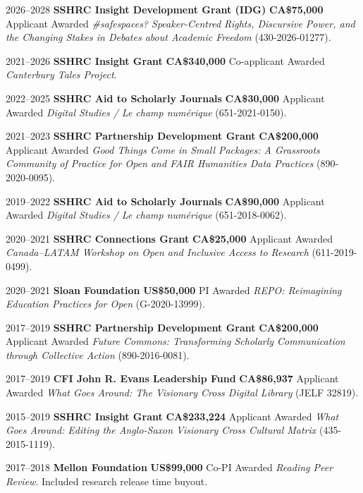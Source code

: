\documentclass[11pt,letterpaper,sans]{moderncv}
\begin{document}
{\cventry
  {2026--2028}
  {\textbf{SSHRC Insight Development Grant (IDG)}}
  {\textbf{CA\$75{,}000}}
  {Applicant}
  {Awarded}
  {\emph{\#safespaces? Speaker-Centred Rights, Discursive Power, and the Changing Stakes in Debates about Academic Freedom} (430-2026-01277).}

\cventry
  {2021--2026}
  {\textbf{SSHRC Insight Grant}}
  {\textbf{CA\$340{,}000}}
  {Co-applicant}
  {Awarded}
  {\emph{Canterbury Tales Project}.}

\cventry
  {2022--2025}
  {\textbf{SSHRC Aid to Scholarly Journals}}
  {\textbf{CA\$30{,}000}}
  {Applicant}
  {Awarded}
  {\emph{Digital Studies / Le champ numérique} (651-2021-0150).}

\cventry
  {2021--2023}
  {\textbf{SSHRC Partnership Development Grant}}
  {\textbf{CA\$200{,}000}}
  {Applicant}
  {Awarded}
  {\emph{Good Things Come in Small Packages: A Grassroots Community of Practice for Open and FAIR Humanities Data Practices} (890-2020-0095).}

\cventry
  {2019--2022}
  {\textbf{SSHRC Aid to Scholarly Journals}}
  {\textbf{CA\$90{,}000}}
  {Applicant}
  {Awarded}
  {\emph{Digital Studies / Le champ numérique} (651-2018-0062).}

\cventry
  {2020--2021}
  {\textbf{SSHRC Connections Grant}}
  {\textbf{CA\$25{,}000}}
  {Applicant}
  {Awarded}
  {\emph{Canada–LATAM Workshop on Open and Inclusive Access to Research} (611-2019-0499).}

\cventry
  {2020--2021}
  {\textbf{Sloan Foundation}}
  {\textbf{US\$50{,}000}}
  {PI}
  {Awarded}
  {\emph{REPO: Reimagining Education Practices for Open} (G-2020-13999).}

\cventry
  {2017--2019}
  {\textbf{SSHRC Partnership Development Grant}}
  {\textbf{CA\$200{,}000}}
  {Applicant}
  {Awarded}
  {\emph{Future Commons: Transforming Scholarly Communication through Collective Action} (890-2016-0081).}

\cventry
  {2017--2019}
  {\textbf{CFI John R. Evans Leadership Fund}}
  {\textbf{CA\$86{,}937}}
  {Applicant}
  {Awarded}
  {\emph{What Goes Around: The Visionary Cross Digital Library} (JELF 32819).}

\cventry
  {2015--2019}
  {\textbf{SSHRC Insight Grant}}
  {\textbf{CA\$233{,}224}}
  {Applicant}
  {Awarded}
  {\emph{What Goes Around: Editing the Anglo-Saxon Visionary Cross Cultural Matrix} (435-2015-1119).}

\cventry
  {2017--2018}
  {\textbf{Mellon Foundation}}
  {\textbf{US\$99{,}000}}
  {Co-PI}
  {Awarded}
  {\emph{Reading Peer Review}. Included research release time buyout.}

}
\end{document}
